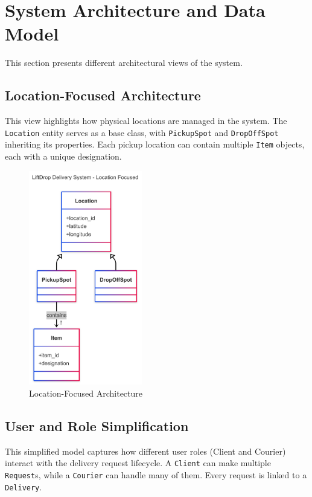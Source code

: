\section{System Architecture and Data Model}

This section presents different architectural views of the system.

\subsection{Location-Focused Architecture}

This view highlights how physical locations are managed in the system. The \texttt{Location} entity serves as a base class, with \texttt{PickupSpot} and \texttt{DropOffSpot} inheriting its properties. Each pickup location can contain multiple \texttt{Item} objects, each with a unique designation.

\begin{figure}[H]
    \centering
    \includegraphics[width=0.44\textwidth]{images/LocationDiagram.png}
    \caption{Location-Focused Architecture}
\end{figure}

\newpage

\subsection{User and Role Simplification}

This simplified model captures how different user roles (Client and Courier) interact with the delivery request lifecycle. A \texttt{Client} can make multiple \texttt{Request}s, while a \texttt{Courier} can handle many of them. Every request is linked to a \texttt{Delivery}.

